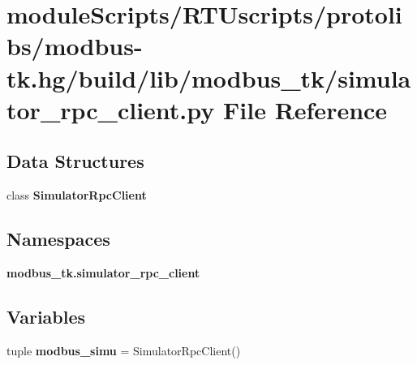 \section{module\+Scripts/\+R\+T\+Uscripts/protolibs/modbus-\/tk.hg/build/lib/modbus\+\_\+tk/simulator\+\_\+rpc\+\_\+client.py File Reference}
\label{modbus-tk_8hg_2build_2lib_2modbus__tk_2simulator__rpc__client_8py}
\subsection*{Data Structures}
\begin{DoxyCompactItemize}
\item 
class {\bf Simulator\+Rpc\+Client}
\end{DoxyCompactItemize}
\subsection*{Namespaces}
\begin{DoxyCompactItemize}
\item 
 {\bf modbus\+\_\+tk.\+simulator\+\_\+rpc\+\_\+client}
\end{DoxyCompactItemize}
\subsection*{Variables}
\begin{DoxyCompactItemize}
\item 
tuple {\bf modbus\+\_\+simu} = Simulator\+Rpc\+Client()
\end{DoxyCompactItemize}
